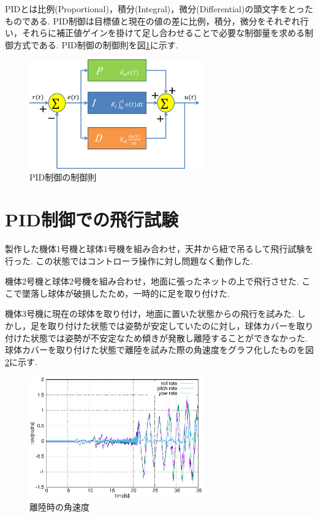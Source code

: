 \documentclass[12pt,oneside]{sotsuken_paper}
\begin{document}
PIDとは比例(Proportional)，積分(Integral)，微分(Differential)の頭文字をとったものである.
PID制御は目標値と現在の値の差に比例，積分，微分をそれぞれ行い，それらに補正値ゲインを掛けて足し合わせることで必要な制御量を求める制御方式である.\cite{pid}
PID制御の制御則を図\ref{fig:PID}に示す.

\begin{figure}[htbp]
	\begin{center}
		\includegraphics[width=75mm]{image/susiki/PID.png}
		\caption{PID制御の制御則}
		\label{fig:PID}
	\end{center}
\end{figure}

\section{PID制御での飛行試験}
製作した機体1号機と球体1号機を組み合わせ，天井から紐で吊るして飛行試験を行った.
この状態ではコントローラ操作に対し問題なく動作した.

機体2号機と球体2号機を組み合わせ，地面に張ったネットの上で飛行させた.
ここで墜落し球体が破損したため，一時的に足を取り付けた.

機体3号機に現在の球体を取り付け，地面に置いた状態からの飛行を試みた.
しかし，足を取り付けた状態では姿勢が安定していたのに対し，球体カバーを取り付けた状態では姿勢が不安定なため傾きが発散し離陸することができなかった.
球体カバーを取り付けた状態で離陸を試みた際の角速度をグラフ化したものを図\ref{fig:PID-flight}に示す.

\begin{figure}[htbp]
	\begin{center}
		\includegraphics[width=75mm]{image/flight-test/PID-flight.eps}
		\caption{離陸時の角速度}
		\label{fig:PID-flight}
	\end{center}
\end{figure}
\end{document}
